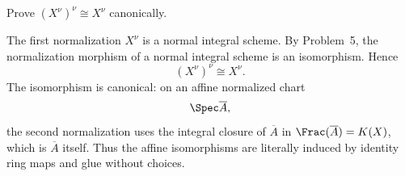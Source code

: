 \begin{problem}\label{prob:vi28-06}
Prove \((X^\nu)^\nu\cong X^\nu\) canonically.

\end{problem}

\ifdefined\FullProblemDossiers
\begin{solution}
The first normalization \(X^\nu\) is a normal integral scheme. By Problem~5, the normalization morphism of a normal integral scheme is an isomorphism. Hence
\[
(X^\nu)^\nu\cong X^\nu.
\]
The isomorphism is canonical: on an affine normalized chart
\[
\Spec\overline A,
\]
the second normalization uses the integral closure of \(\overline A\) in
\(\Frac(\overline A)=K(X)\), which is \(\overline A\) itself. Thus the affine isomorphisms are literally induced by identity ring maps and glue without choices.
\end{solution}
\fi
